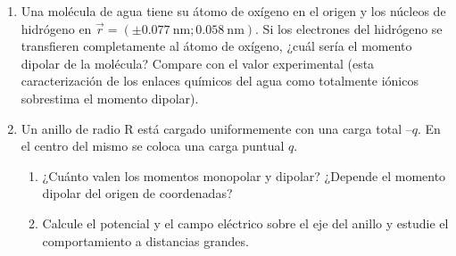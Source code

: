 \documentclass[11pt,spanish,a4paper]{article}
\begin{document}
\begin{enumerate}
\item Una molécula de agua tiene su átomo de oxígeno en el origen y los núcleos de hidrógeno en \(\vec{r}= (\pm\SI{0.077}{\nano\metre}; \SI{0.058}{\nano\metre} ) \).
Si los electrones del hidrógeno se transfieren completamente al átomo de oxígeno, ¿cuál sería el momento dipolar de la molécula?
Compare con el valor experimental (esta caracterización de los enlaces químicos del agua como totalmente iónicos sobrestima el momento dipolar).


\item Un anillo de radio R está cargado uniformemente con una carga total \(–q\).
En el centro del mismo se coloca una carga puntual \(q\).
\begin{enumerate}
  \item ¿Cuánto valen los momentos monopolar y dipolar?
¿Depende el momento dipolar del origen de coordenadas?
  \item Calcule el potencial y el campo eléctrico sobre el eje del anillo y estudie el comportamiento a distancias grandes.
\end{enumerate}



\end{enumerate}
\end{document}

